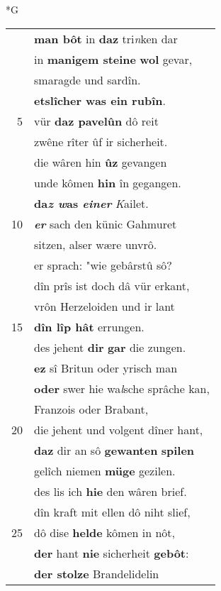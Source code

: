 \documentclass[8pt,a4paper,notitlepage]{article}
\begin{document}
\newpage
\begin{table}[ht]
\begin{minipage}[t]{0.5\linewidth}
\small
\begin{center}*G
\end{center}
\begin{tabular}{rl}
 & \textbf{man bôt} in \textbf{daz} tri\textit{n}ken dar\\ 
 & in \textbf{manigem steine} \textbf{wol} gevar,\\ 
 & smaragde und sardîn.\\ 
 & \textbf{etslîcher was ein rubîn}.\\ 
5 & vür \textbf{daz pavelûn} dô reit\\ 
 & zwêne rîter ûf ir sicherheit.\\ 
 & die wâren hin \textbf{ûz} gevangen\\ 
 & unde kômen \textbf{hin} în gegangen.\\ 
 & \textbf{da\textit{z w}as \textit{einer}} \textit{K}ailet.\\ 
10 & \textit{\textbf{er}} sach den künic Gahmuret\\ 
 & sitzen, alser wære unvrô.\\ 
 & er sprach: "wie gebârstû sô?\\ 
 & dîn prîs ist doch dâ vür erkant,\\ 
 & vrôn Herzeloiden und ir lant\\ 
15 & \textbf{dîn lîp hât} errungen.\\ 
 & des jehent \textbf{dir} \textbf{gar} die zungen.\\ 
 & \textbf{ez} sî Britun oder yrisch man\\ 
 & \textbf{oder} swer hie wa\textit{l}sche sprâche kan,\\ 
 & Franzois oder Brabant,\\ 
20 & die jehent und volgent dîner hant,\\ 
 & \textbf{daz} dir an sô \textbf{gewanten} \textbf{spilen}\\ 
 & gelîch niemen \textbf{müge} gezilen.\\ 
 & des lis ich \textbf{hie} den wâren brief.\\ 
 & dîn kraft mit ellen dô niht slief,\\ 
25 & dô dise \textbf{helde} kômen in nôt,\\ 
 & \textbf{der} hant \textbf{nie} sicherheit \textbf{gebôt}:\\ 
 & \textbf{der stolze} Brandelidelin\\ 

\end{tabular}
\end{minipage}
\end{table}
\end{document}
